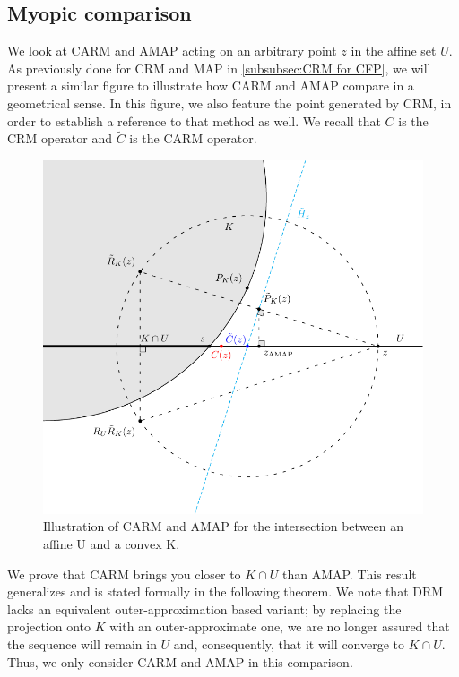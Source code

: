 \documentclass[smallextended,numbook,nospthms]{svjour3}
\theoremstyle{plain}
\theoremstyle{definition}
\begin{document}
\subsection{Myopic comparison}\label{subsec:myopic comp}

We look at CARM and AMAP acting on an arbitrary point $z$ in the affine set $U$. As previously done for CRM and MAP in \cref{subsubsec:CRM for CFP}, we will present a similar figure to illustrate how CARM and AMAP compare in a geometrical sense. In this figure, we also feature the point generated by CRM, in order to establish a reference to that method as well. We recall that $C$ is the CRM operator and $\tilde{C}$ is the CARM operator.

\begin{figure}[h!]
	\centering
	\includegraphics[scale=0.8]{ConvexAffine-CARM}
	\caption{Illustration of CARM and AMAP for the intersection between an affine U and a convex K.}
	\label{fig:CARM AMAP comp}
\end{figure}

We prove that CARM brings you closer to $K \cap U$ than AMAP. This result generalizes \cite[Theorem 2]{Behling:2020} and is stated formally in the following theorem. We note that DRM lacks an equivalent outer-approximation based variant; by replacing the projection onto $K$ with an outer-approximate one, we are no longer assured that the sequence will remain in $U$ and, consequently, that it will converge to $K \cap U$. Thus, we only consider CARM and AMAP in this comparison.
\end{document}
